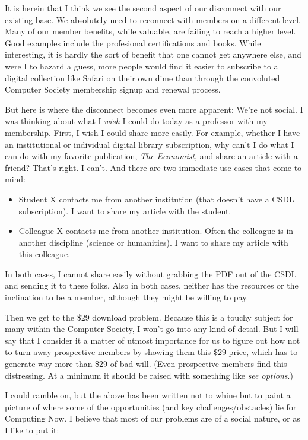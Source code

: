 \documentclass[11pt,english]{luclet}
\begin{document}
It is herein that I think we see the second aspect of our disconnect
with our existing base. We absolutely need to reconnect with members on
a different level. Many of our member benefits, while valuable, are
failing to reach a higher level. Good examples include the profesional
certifications and books. While interesting, it is hardly the sort of
benefit that one cannot get anywhere else, and were I to hazard a guess,
more people would find it easier to subscribe to a digital collection
like Safari on their own dime than through the convoluted Computer
Society membership signup and renewal process.

But here is where the disconnect becomes even more apparent: We're not
social. I was thinking about what I \emph{wish} I could do today as a
professor with my membership. First, I wish I could share more easily.
For example, whether I have an institutional or individual digital
library subscription, why can't I do what I can do with my favorite
publication, \emph{The Economist}, and share an article with a friend?
That's right. I can't. And there are two immediate use cases that come
to mind:

\begin{itemize}
\item
  Student X contacts me from another institution (that doesn't have a
  CSDL subscription). I want to share my article with the student.
\item
  Colleague X contacts me from another institution. Often the colleague
  is in another discipline (science or humanities). I want to share my
  article with this colleague.
\end{itemize}
In both cases, I cannot share easily without grabbing the PDF out of the
CSDL and sending it to these folks. Also in both cases, neither has the
resources or the inclination to be a member, although they might be
willing to pay.

Then we get to the \$29 download problem. Because this is a touchy
subject for many within the Computer Society, I won't go into any kind
of detail. But I will say that I consider it a matter of utmost
importance for us to figure out how not to turn away prospective members
by showing them this \$29 price, which has to generate way more than
\$29 of bad will. (Even prospective members find this distressing. At a
minimum it should be raised with something like \emph{see options}.)

I could ramble on, but the above has been written not to whine but to
paint a picture of where some of the opportunities (and key
challenges/obstacles) lie for Computing Now. I believe that most of our
problems are of a social nature, or as I like to put it:
\end{document}
